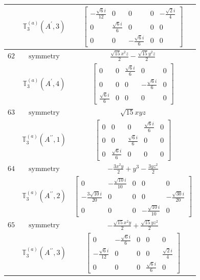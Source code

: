 \documentclass[fleqn,8pt,landscape]{jsarticle}
\begin{document}
\begin{longtable}{ccc}
$  $ & $ \mathbb{T}_{3}^{(a)}(A^{\prime},3) $ & $ \begin{bmatrix} - \frac{\sqrt{6} i}{12} & 0 & 0 & 0 & - \frac{\sqrt{2} i}{4} \\ 0 & \frac{\sqrt{6} i}{6} & 0 & 0 & 0 \\ 0 & 0 & - \frac{\sqrt{6} i}{6} & 0 & 0 \end{bmatrix} $ \\ \hline
$ 62 $ & $ \text{symmetry} $ & $ \frac{\sqrt{15} x^{2} z}{2} - \frac{\sqrt{15} y^{2} z}{2} $ \\
$  $ & $ \mathbb{T}_{3}^{(a)}(A^{\prime},4) $ & $ \begin{bmatrix} 0 & 0 & \frac{\sqrt{6} i}{6} & 0 & 0 \\ 0 & 0 & 0 & - \frac{\sqrt{6} i}{6} & 0 \\ \frac{\sqrt{6} i}{6} & 0 & 0 & 0 & 0 \end{bmatrix} $ \\ \hline
$ 63 $ & $ \text{symmetry} $ & $ \sqrt{15} x y z $ \\
$  $ & $ \mathbb{T}_{3}^{(a)}(A^{\prime\prime},1) $ & $ \begin{bmatrix} 0 & 0 & 0 & \frac{\sqrt{6} i}{6} & 0 \\ 0 & 0 & \frac{\sqrt{6} i}{6} & 0 & 0 \\ 0 & \frac{\sqrt{6} i}{6} & 0 & 0 & 0 \end{bmatrix} $ \\ \hline
$ 64 $ & $ \text{symmetry} $ & $ - \frac{3 x^{2} y}{2} + y^{3} - \frac{3 y z^{2}}{2} $ \\
$  $ & $ \mathbb{T}_{3}^{(a)}(A^{\prime\prime},2) $ & $ \begin{bmatrix} 0 & - \frac{\sqrt{10} i}{10} & 0 & 0 & 0 \\ - \frac{3 \sqrt{10} i}{20} & 0 & 0 & 0 & - \frac{\sqrt{30} i}{20} \\ 0 & 0 & 0 & - \frac{\sqrt{10} i}{10} & 0 \end{bmatrix} $ \\ \hline
$ 65 $ & $ \text{symmetry} $ & $ - \frac{\sqrt{15} x^{2} y}{2} + \frac{\sqrt{15} y z^{2}}{2} $ \\
$  $ & $ \mathbb{T}_{3}^{(a)}(A^{\prime\prime},3) $ & $ \begin{bmatrix} 0 & - \frac{\sqrt{6} i}{6} & 0 & 0 & 0 \\ - \frac{\sqrt{6} i}{12} & 0 & 0 & 0 & \frac{\sqrt{2} i}{4} \\ 0 & 0 & 0 & \frac{\sqrt{6} i}{6} & 0 \end{bmatrix} $ \\ \hline

\end{longtable}
\end{document}
